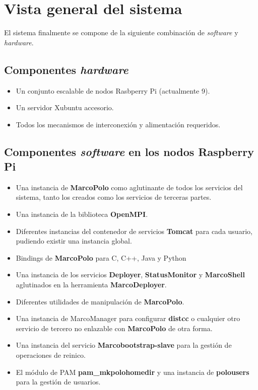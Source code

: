 \section{Vista general del sistema}

El sistema finalmente se compone de la siguiente combinación de \textit{software} y \textit{hardware}.

\subsection{Componentes \textit{hardware}}

\begin{itemize}
\item Un conjunto escalable de nodos Rasbperry Pi (actualmente 9).
\item Un servidor Xubuntu accesorio.
\item Todos los mecanismos de interconexión y alimentación requeridos.
\end{itemize}

\subsection{Componentes \textit{software} en los nodos Raspberry Pi}

\begin{itemize}
	\item Una instancia de \textbf{MarcoPolo} como aglutinante de todos los servicios del sistema, tanto los creados como los servicios de terceras partes.
	\item Una instancia de la biblioteca \textbf{OpenMPI}.
	\item Diferentes instancias del contenedor de servicios \textbf{Tomcat} para cada usuario, pudiendo existir una instancia global.
	\item Bindings de \textbf{MarcoPolo} para C, C++, Java y Python
	\item Una instancia de los servicios \textbf{Deployer}, \textbf{StatusMonitor} y \textbf{MarcoShell} aglutinados en la herramienta \textbf{MarcoDeployer}.
	\item Diferentes utilidades de manipulación de \textbf{MarcoPolo}.
	\item Una instancia de MarcoManager para configurar \textbf{distcc} o cualquier otro servicio de tercero no enlazable con \textbf{MarcoPolo} de otra forma.
	\item Una instancia del servicio \textbf{Marcobootstrap-slave} para la gestión de operaciones de reinico.
	\item El módulo de PAM \textbf{pam\_mkpolohomedir} y una instancia de \textbf{polousers} para la gestión de usuarios.
\end{itemize}

